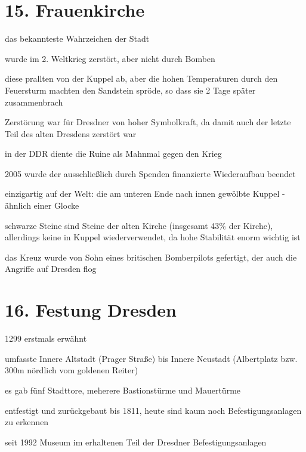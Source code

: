 \documentclass[a4paper,12pt]{report}
\begin{document}
\section{15. Frauenkirche}
\begin{itemize*}
\item das bekannteste Wahrzeichen der Stadt
\item wurde im 2. Weltkrieg zerstört, aber nicht durch Bomben
    \begin{itemize*}
    \item diese prallten von der Kuppel ab, aber die hohen Temperaturen durch den Feuersturm machten den Sandstein spröde, so dass sie 2 Tage später zusammenbrach
    \item Zerstörung war für Dresdner von hoher Symbolkraft, da damit auch der letzte Teil des alten Dresdens zerstört war
    \end{itemize*}
\item in der DDR diente die Ruine als Mahnmal gegen den Krieg
\item 2005 wurde der ausschließlich durch Spenden finanzierte Wiederaufbau beendet
\item einzigartig auf der Welt: die am unteren Ende nach innen gewölbte Kuppel - ähnlich einer Glocke
\item schwarze Steine sind Steine der alten Kirche (insgesamt 43\% der Kirche), allerdings keine in Kuppel wiederverwendet, da hohe Stabilität enorm wichtig ist
\item das Kreuz wurde von Sohn eines britischen Bomberpilots gefertigt, der auch die Angriffe auf Dresden flog
\end{itemize*}

\section{16. Festung Dresden}
\begin{itemize*}
\item 1299 erstmals erwähnt
\item umfasste Innere Altstadt (Prager Straße) bis Innere Neustadt (Albertplatz bzw. 300m nördlich vom goldenen Reiter)
\item es gab fünf Stadttore, meherere Bastionstürme und Mauertürme
\item entfestigt und zurückgebaut bis 1811, heute sind kaum noch Befestigungsanlagen zu erkennen
\item seit 1992 Museum im erhaltenen Teil der Dresdner Befestigungsanlagen
\end{itemize*}
\end{document}
